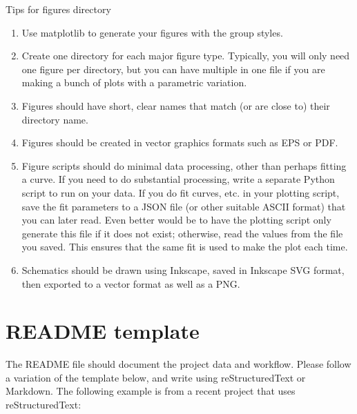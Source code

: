 \documentclass{article}
\begin{document}
Tips for figures directory
\begin{enumerate}
\item Use matplotlib to generate your figures with the group styles. 
\item Create one directory for each major figure type. Typically, you will only need one figure per
directory, but you can have multiple in one file if you are making a bunch of plots with a
parametric variation.
\item Figures should have short, clear names that match (or are close to) their directory name.
\item Figures should be created in vector graphics formats such as EPS or PDF.
\item Figure scripts should do minimal data processing, other than perhaps fitting a curve. If you
need to do substantial processing, write a separate Python script to run on your data. If you
do fit curves, etc. in your plotting script, save the fit parameters to a JSON file (or other suitable
ASCII format) that you can later read. Even better would be to have the plotting script only
generate this file if it does not exist; otherwise, read the values from the file you saved. This
ensures that the same fit is used to make the plot each time.
\item Schematics should be drawn using Inkscape, saved in Inkscape SVG format, then exported
to a vector format as well as a PNG.
\end{enumerate} 


\section{README template}

The README file should document the project data and workflow. Please follow a variation of
the template below, and write using reStructuredText or Markdown. The following example is from
a recent project that uses reStructuredText:
\end{document}
